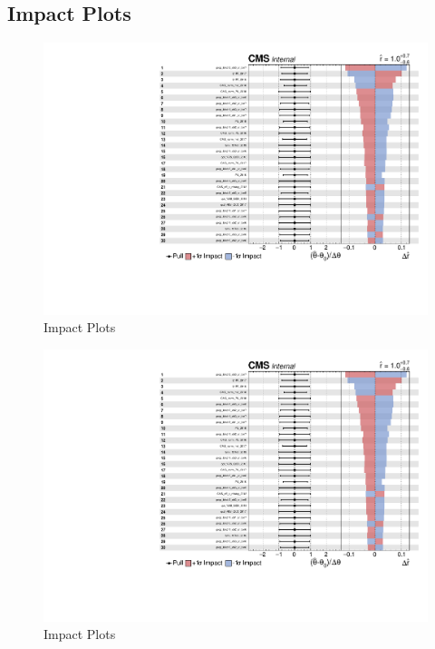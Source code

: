 \clearpage
\subsection{
  Impact Plots
}
\begin{figure}[!ht]
  \centering
  \includegraphics[width=\textwidth,page=1]{analysis_plots/impact_plots/impacts_datacard_run2_z.pdf}
  \caption[Impact Plots]%
  {Impact Plots}%
  \label{fig:vbs-impact-plots-page1}
\end{figure}

\begin{figure}[!ht]
  \centering
  \includegraphics[width=\textwidth,page=2]{analysis_plots/impact_plots/impacts_datacard_run2_z.pdf}
  \caption[Impact Plots]%
  {Impact Plots}%
  \label{fig:vbs-impact-plots-page2}
\end{figure}

